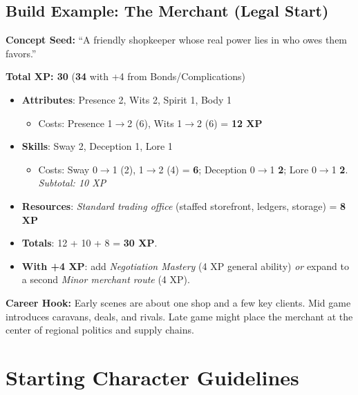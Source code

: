 \subsection*{Build Example: The Merchant (Legal Start)}

\textbf{Concept Seed:} ``A friendly shopkeeper whose real power lies in who owes them favors.''

\medskip

\noindent\textbf{Total XP: 30} \quad (\textbf{34} with +4 from Bonds/Complications)

\begin{itemize}
\item \textbf{Attributes}: Presence 2, Wits 2, Spirit 1, Body 1
  \begin{itemize}
  \item Costs: Presence 1$\to$2 (6), Wits 1$\to$2 (6) = \textbf{12 XP}
  \end{itemize}
\item \textbf{Skills}: Sway 2, Deception 1, Lore 1
  \begin{itemize}
  \item Costs: Sway 0$\to$1 (2), 1$\to$2 (4) = \textbf{6};  
        Deception 0$\to$1 \textbf{2};  
        Lore 0$\to$1 \textbf{2}.  
        \emph{Subtotal: 10 XP}
  \end{itemize}
\item \textbf{Resources}: \emph{Standard trading office} (staffed storefront, ledgers, storage) = \textbf{8 XP}
\item \textbf{Totals}: 12 + 10 + 8 = \textbf{30 XP}.
\item \textbf{With +4 XP}: add \emph{Negotiation Mastery} (4 XP general ability) \emph{or} expand to a second \emph{Minor merchant route} (4 XP).
\end{itemize}

\noindent\textbf{Career Hook:} Early scenes are about one shop and a few key clients.
Mid game introduces caravans, deals, and rivals. Late game might place the
merchant at the center of regional politics and supply chains.


\section{Starting Character Guidelines}
\label{sec:xp-starting-guidelines}

